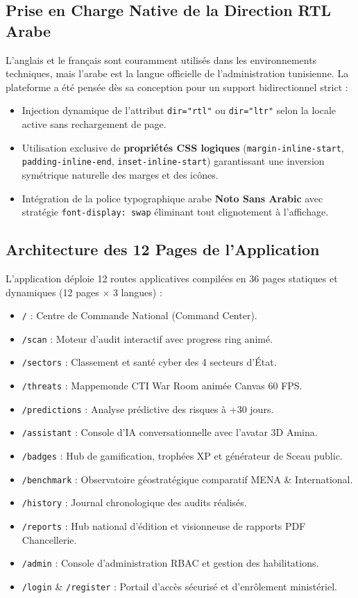 \subsection{Prise en Charge Native de la Direction RTL Arabe}
L'anglais et le français sont couramment utilisés dans les environnements techniques, mais l'arabe est la langue officielle de l'administration tunisienne. La plateforme a été pensée dès sa conception pour un support bidirectionnel strict :
\begin{itemize}
    \item Injection dynamique de l'attribut \texttt{dir="rtl"} ou \texttt{dir="ltr"} selon la locale active sans rechargement de page.
    \item Utilisation exclusive de \textbf{propriétés CSS logiques} (\texttt{margin-inline-start}, \texttt{padding-inline-end}, \texttt{inset-inline-start}) garantissant une inversion symétrique naturelle des marges et des icônes.
    \item Intégration de la police typographique arabe \textbf{Noto Sans Arabic} avec stratégie \texttt{font-display: swap} éliminant tout clignotement à l'affichage.
\end{itemize}

\subsection{Architecture des 12 Pages de l'Application}
L'application déploie 12 routes applicatives compilées en 36 pages statiques et dynamiques (12 pages $\times$ 3 langues) :
\begin{itemize}
    \item \texttt{/} : Centre de Commande National (Command Center).
    \item \texttt{/scan} : Moteur d'audit interactif avec progress ring animé.
    \item \texttt{/sectors} : Classement et santé cyber des 4 secteurs d'État.
    \item \texttt{/threats} : Mappemonde CTI War Room animée Canvas 60 FPS.
    \item \texttt{/predictions} : Analyse prédictive des risques à +30 jours.
    \item \texttt{/assistant} : Console d'IA conversationnelle avec l'avatar 3D Amina.
    \item \texttt{/badges} : Hub de gamification, trophées XP et générateur de Sceau public.
    \item \texttt{/benchmark} : Observatoire géostratégique comparatif MENA \& International.
    \item \texttt{/history} : Journal chronologique des audits réalisés.
    \item \texttt{/reports} : Hub national d'édition et visionneuse de rapports PDF Chancellerie.
    \item \texttt{/admin} : Console d'administration RBAC et gestion des habilitations.
    \item \texttt{/login} \& \texttt{/register} : Portail d'accès sécurisé et d'enrôlement ministériel.
\end{itemize}
